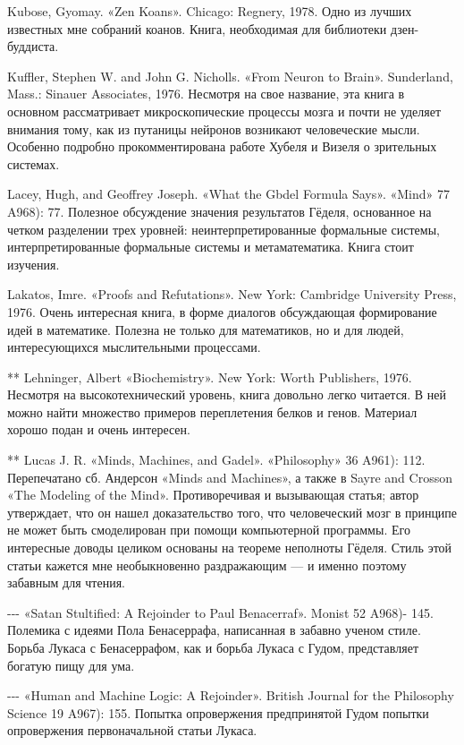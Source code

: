 Kubose, Gyomay. «Zen Koans». Chicago: Regnery, 1978. Одно из лучших известных мне собраний коанов. Книга, необходимая для библиотеки дзен-буддиста.

Kuffler, Stephen W. and John G. Nicholls. «From Neuron to Brain». Sunderland, Mass.: Sinauer Associates, 1976. Несмотря на свое название, эта книга в основном рассматривает микроскопические процессы мозга и почти не уделяет внимания тому, как из путаницы нейронов возникают человеческие мысли. Особенно подробно прокомментирована работе Хубеля и Визеля о зрительных системах.

Lacey, Hugh, and Geoffrey Joseph. «What the Gbdel Formula Says». «Mind» 77 A968): 77. Полезное обсуждение значения результатов Гёделя, основанное на четком разделении трех уровней: неинтерпретированные формальные системы, интерпретированные формальные системы и метаматематика. Книга стоит изучения.

Lakatos, Imre. «Proofs and Refutations». New York: Cambridge University Press, 1976. Очень интересная книга, в форме диалогов обсуждающая формирование идей в математике. Полезна не только для математиков, но и для людей, интересующихся мыслительными процессами.

** Lehninger, Albert «Biochemistry». New York: Worth Publishers, 1976. Несмотря на высокотехнический уровень, книга довольно легко читается. В ней можно найти множество примеров переплетения белков и генов. Материал хорошо подан и очень интересен.

** Lucas J. R. «Minds, Machines, and Gadel». «Philosophy» 36 A961): 112. Перепечатано сб. Андерсон «Minds and Machines», а также в Sayre and Crosson «The Modeling of the Mind». Противоречивая и вызывающая статья; автор утверждает, что он нашел доказательство того, что человеческий мозг в принципе не может быть смоделирован при помощи компьютерной программы. Его интересные доводы целиком основаны на теореме неполноты Гёделя. Стиль этой статьи кажется мне необыкновенно раздражающим --- и именно поэтому забавным для чтения.

-\/-\/- «Satan Stultified: A Rejoinder to Paul Benacerraf». Monist 52 A968)- 145. Полемика с идеями Пола Бенасеррафа, написанная в забавно ученом стиле. Борьба Лукаса с Бенасеррафом, как и борьба Лукаса с Гудом, представляет богатую пищу для ума.

-\/-\/- «Human and Machine Logic: A Rejoinder». British Journal for the Philosophy Science 19 A967): 155. Попытка опровержения предпринятой Гудом попытки опровержения первоначальной статьи Лукаса.


